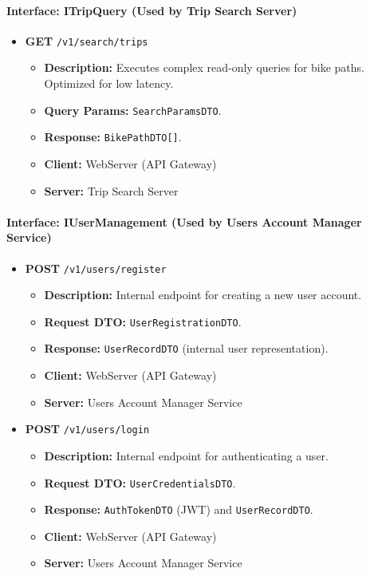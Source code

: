 \paragraph{Interface: ITripQuery (Used by Trip Search Server)}
\begin{itemize}
    \item \textbf{GET} \texttt{/v1/search/trips}
    \begin{itemize}
        \item \textbf{Description:} Executes complex read-only queries for bike paths. Optimized for low latency.
        \item \textbf{Query Params:} \texttt{SearchParamsDTO}.
        \item \textbf{Response:} \texttt{BikePathDTO[]}.
        \item \textbf{Client:} WebServer (API Gateway)
        \item \textbf{Server:} Trip Search Server
    \end{itemize}
\end{itemize}

\paragraph{Interface: IUserManagement (Used by Users Account Manager Service)}
\begin{itemize}
    \item \textbf{POST} \texttt{/v1/users/register}
    \begin{itemize}
        \item \textbf{Description:} Internal endpoint for creating a new user account.
        \item \textbf{Request DTO:} \texttt{UserRegistrationDTO}.
        \item \textbf{Response:} \texttt{UserRecordDTO} (internal user representation).
        \item \textbf{Client:} WebServer (API Gateway)
        \item \textbf{Server:} Users Account Manager Service
    \end{itemize}
    
    \item \textbf{POST} \texttt{/v1/users/login}
    \begin{itemize}
        \item \textbf{Description:} Internal endpoint for authenticating a user.
        \item \textbf{Request DTO:} \texttt{UserCredentialsDTO}.
        \item \textbf{Response:} \texttt{AuthTokenDTO} (JWT) and \texttt{UserRecordDTO}.
        \item \textbf{Client:} WebServer (API Gateway)
        \item \textbf{Server:} Users Account Manager Service
    \end{itemize}
\end{itemize}

